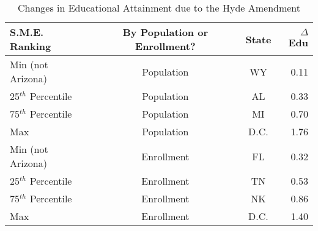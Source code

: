             \begin{table}[H]
                \caption{Changes in Educational Attainment due to the Hyde Amendment}
                \centering\footnotesize{
                \begin{tabular}{lccr}
                \hline
                S.M.E. Ranking & By Population or Enrollment? & State & $\Delta$Edu\\
                \hline
                Min (not Arizona) & Population & WY & 0.11 \\
                25$^{th}$ Percentile & Population & AL & 0.33 \\
                75$^{th}$ Percentile & Population & MI & 0.70 \\
                Max & Population & D.C. & 1.76 \\
                Min (not Arizona) & Enrollment & FL & 0.32 \\
                25$^{th}$ Percentile & Enrollment & TN & 0.53 \\
                75$^{th}$ Percentile & Enrollment & NK & 0.86 \\
                Max & Enrollment & D.C. & 1.40 \\
                \hline
                \end{tabular}}
            \end{table}
